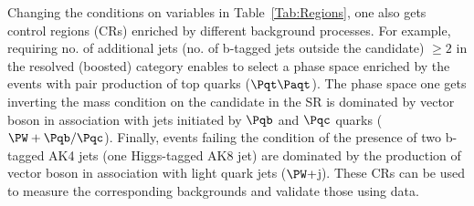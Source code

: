 \documentclass[a4paper,11pt]{article}
\newcommand{\Pb}{{{\Pqb}}\xspace}
\newcommand{\Pt}{{{\Pqt}}\xspace}
\newcommand{\Pc}{{{\Pqc}}\xspace}
\newcommand{\PAt}{{{{\Paqt}}}\xspace}
\begin{document}
Changing the conditions on variables in  Table~\ref{Tab:Regions}, one also gets control regions (CRs) enriched by different background processes. 
For example, requiring no. of additional jets (no. of b-tagged jets outside the \PH candidate) $\geq 2$ in the resolved (boosted) category enables to select a phase space enriched by the events with pair production of top quarks ($\Pt\PAt$).
The phase space one gets inverting the mass condition on the \PH candidate in the SR is dominated by vector boson in association with jets initiated by $\Pb$ and $\Pc$ quarks (${\PW}+\Pb/\Pc$). 
Finally, events failing the condition of the presence of two b-tagged AK4 jets (one Higgs-tagged AK8 jet) are dominated by the production of vector boson in association with light quark jets (${\PW}+$j).
These CRs can be used to measure the corresponding backgrounds and validate those using data.
\end{document}
